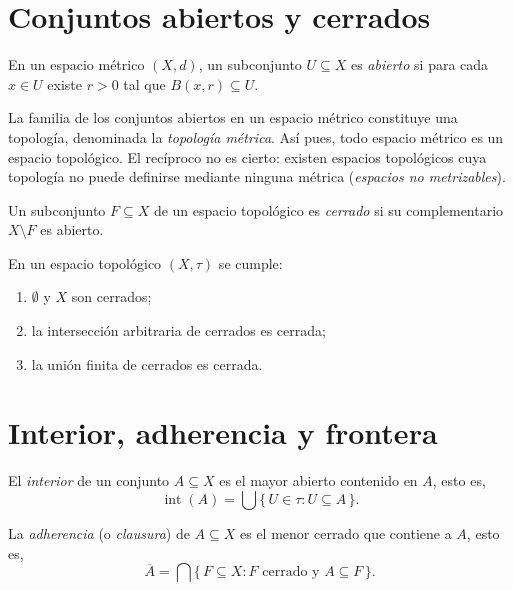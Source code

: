 \section{Conjuntos abiertos y cerrados}

\begin{definition}\label{def:abierto-metrico}
En un espacio métrico $(X,d)$, un subconjunto $U\subseteq X$ es \emph{abierto}
si para cada $x\in U$ existe $r>0$ tal que $B(x,r)\subseteq U$.
\end{definition}

La familia de los conjuntos abiertos en un espacio métrico constituye una
topología, denominada la \emph{topología métrica}. Así pues, todo espacio
métrico es un espacio topológico. El recíproco no es cierto: existen espacios
topológicos cuya topología no puede definirse mediante ninguna métrica
(\emph{espacios no metrizables}).

\begin{definition}\label{def:cerrado-top}
Un subconjunto $F\subseteq X$ de un espacio topológico es \emph{cerrado} si
su complementario $X\setminus F$ es abierto.
\end{definition}

\begin{proposition}\label{prop:prop-cerrados-top}
En un espacio topológico $(X,\tau)$ se cumple:
\begin{enumerate}
  \item[(i)] $\emptyset$ y $X$ son cerrados;
  \item[(ii)] la intersección arbitraria de cerrados es cerrada;
  \item[(iii)] la unión finita de cerrados es cerrada.
\end{enumerate}
\end{proposition}

\section{Interior, adherencia y frontera}

\begin{definition}\label{def:interior-top}
El \emph{interior} de un conjunto $A\subseteq X$ es el mayor abierto contenido
en $A$, esto es,
\[
  \operatorname{int}(A)=\bigcup\{\,U\in\tau : U\subseteq A\,\}.
\]
\end{definition}

\begin{definition}\label{def:adherencia}
La \emph{adherencia} (o \emph{clausura}) de $A\subseteq X$ es el menor cerrado
que contiene a $A$, esto es,
\[
  \overline{A}=\bigcap\{\,F\subseteq X : F\text{ cerrado y }A\subseteq F\,\}.
\]
\end{definition}

